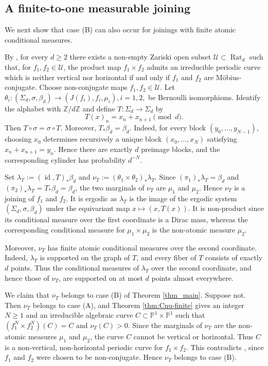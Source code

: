 \documentclass[11pt]{amsart}
\numberwithin{equation}{section}
\theoremstyle{plain}
\theoremstyle{definition}
\theoremstyle{remark}
\begin{document}
\subsection{A finite-to-one measurable joining}
We next show that case \textup{(B)} can also occur for joinings with
finite atomic conditional measures.

By \cite[Theorem 1.2]{PakovichPeriodicCurves}, for every $d\geq2$
there exists a non-empty Zariski open subset
$\mathcal U\subset\operatorname{Rat}_d$ such that, for
$f_1,f_2\in\mathcal U$, the product map $f_1\times f_2$ admits an
irreducible periodic curve which is neither vertical nor horizontal
if and only if $f_1$ and $f_2$ are M\"obius-conjugate.
Choose non-conjugate maps $f_1,f_2\in\mathcal U$.
Let
$
\theta_i\colon
(\Sigma_d,\sigma,\beta_d)
\to
(J(f_i),f_i,\mu_i),
 i=1,2,
$
be Bernoulli isomorphisms. Identify the alphabet with
$\mathbb Z/d\mathbb Z$ and define
$T\colon\Sigma_d\to\Sigma_d$ by
$$
T(x)_n=x_n+x_{n+1}\pmod d.
$$
Then $T\circ\sigma=\sigma\circ T$. Moreover,
$T_*\beta_d=\beta_d$. Indeed, for every block
$(y_0,\ldots,y_{N-1})$, choosing $x_0$ determines recursively a
unique block $(x_0,\ldots,x_N)$ satisfying
$x_n+x_{n+1}=y_n$. Hence there are exactly $d$ preimage blocks, and
the corresponding cylinder has probability $d^{-N}$.

Set
$
\lambda_T:=
(\operatorname{id},T)_*\beta_d
$
and
$
\nu_T:=
(\theta_1\times\theta_2)_*\lambda_T$.
Since
$(\pi_1)_*\lambda_T=\beta_d$ and
$(\pi_2)_*\lambda_T=T_*\beta_d=\beta_d$, the two marginals of
$\nu_T$ are $\mu_1$ and $\mu_2$. Hence $\nu_T$ is a joining of
$f_1$ and $f_2$. It is ergodic as $\lambda_T$ is the image of
the ergodic system $(\Sigma_d,\sigma,\beta_d)$ under the equivariant
map $x\mapsto(x,T(x))$. It is non-product since its conditional measure over the first
coordinate is a Dirac mass, whereas the corresponding conditional
measure for $\mu_1\times\mu_2$ is the non-atomic measure $\mu_2$.

Moreover, $\nu_T$ has finite atomic conditional measures over the
second coordinate. Indeed, $\lambda_T$ is supported on the graph of
$T$, and every fiber of $T$ consists of exactly $d$ points. Thus the
conditional measures of $\lambda_T$ over the second coordinate, and
hence those of $\nu_T$, are supported on at most $d$ points almost
everywhere.

We claim that $\nu_T$ belongs to case \textup{(B)} of
Theorem \ref{thm_main}. Suppose not. Then $\nu_T$ belongs to
case \textup{(A)}, and Theorem \ref{thm:Cnu-finite} gives an integer
$N\geq1$ and an irreducible algebraic curve
$C\subset\mathbb P^1\times\mathbb P^1$ such that
$(f_1^N\times f_2^N)(C)=C$
and $\nu_T(C)>0$.
Since the marginals of $\nu_T$ are the non-atomic measures
$\mu_1$ and $\mu_2$, the curve $C$ cannot be vertical or horizontal.
Thus $C$ is a non-vertical, non-horizontal periodic curve for
$f_1\times f_2$. This contradicts
\cite[Theorem 1.2]{PakovichPeriodicCurves}, since $f_1$ and $f_2$
were chosen to be non-conjugate. Hence $\nu_T$ belongs to case
\textup{(B)}.
\end{document}
